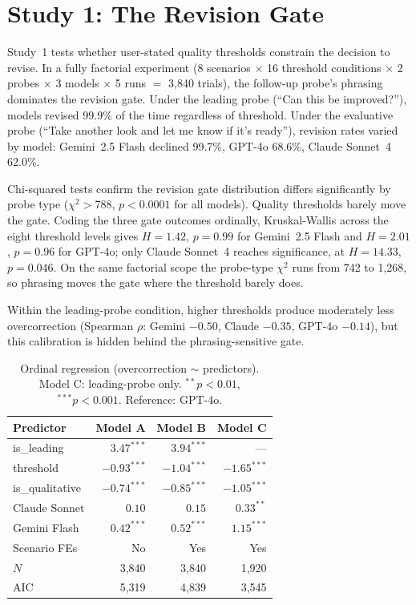 \section{Study 1: The Revision Gate}
\label{sec:appendix-study1}

Study~1 tests whether user-stated quality thresholds constrain the decision to revise. In a fully factorial experiment (8 scenarios $\times$ 16 threshold conditions $\times$ 2 probes $\times$ 3 models $\times$ 5 runs $=$ 3,840 trials), the follow-up probe's phrasing dominates the revision gate. Under the leading probe (``Can this be improved?''), models revised 99.9\% of the time regardless of threshold. Under the evaluative probe (``Take another look and let me know if it's ready''), revision rates varied by model: Gemini~2.5 Flash declined 99.7\%, GPT-4o 68.6\%, Claude Sonnet~4 62.0\%.

Chi-squared tests confirm the revision gate distribution differs significantly by probe type ($\chi^2 > 788$, $p < 0.0001$ for all models). Quality thresholds barely move the gate. Coding the three gate outcomes ordinally, Kruskal-Wallis across the eight threshold levels gives $H = 1.42$, $p = 0.99$ for Gemini~2.5 Flash and $H = 2.01$, $p = 0.96$ for GPT-4o; only Claude Sonnet~4 reaches significance, at $H = 14.33$, $p = 0.046$. On the same factorial scope the probe-type $\chi^2$ runs from 742 to 1,268, so phrasing moves the gate where the threshold barely does.

Within the leading-probe condition, higher thresholds produce moderately less overcorrection (Spearman $\rho$: Gemini $-0.50$, Claude $-0.35$, GPT-4o $-0.14$), but this calibration is hidden behind the phrasing-sensitive gate.

\begin{table}[h]
\centering
\small
\setlength{\tabcolsep}{4pt}
\begin{tabular}{@{}lrrr@{}}
\toprule
\textbf{Predictor} & \textbf{Model A} & \textbf{Model B} & \textbf{Model C} \\
\midrule
is\_leading & $3.47^{***}$ & $3.94^{***}$ & --- \\
threshold & $-0.93^{***}$ & $-1.04^{***}$ & $-1.65^{***}$ \\
is\_qualitative & $-0.74^{***}$ & $-0.85^{***}$ & $-1.05^{***}$ \\
Claude Sonnet & $0.10$ & $0.15$ & $0.33^{**}$ \\
Gemini Flash & $0.42^{***}$ & $0.52^{***}$ & $1.15^{***}$ \\
Scenario FEs & No & Yes & Yes \\
\midrule
$N$ & 3,840 & 3,840 & 1,920 \\
AIC & 5,319 & 4,839 & 3,545 \\
\bottomrule
\end{tabular}
\caption{Ordinal regression (overcorrection $\sim$ predictors). Model C: leading-probe only. $^{**}p<0.01$, $^{***}p<0.001$. Reference: GPT-4o.}
\label{tab:regression}
\end{table}

